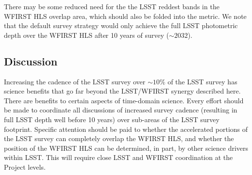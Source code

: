 There may be some reduced need for the the LSST reddest bands in the
WFIRST HLS overlap area, which should also be folded into the metric.
We note that
the default survey strategy would only achieve the full LSST photometric
depth over the WFIRST HLS after 10 years of survey ($\sim2032$).



%
%
%

\subsection{Discussion}
\label{sec:\secname:discussion}

Increasing the cadence of the LSST survey over $\sim10\%$ of the LSST
survey has science benefits that go far beyond the LSST/WFIRST synergy
described here.  There are benefits to certain aspects of time-domain
science.  Every effort should be made to coordinate all discussions of
increased survey cadence (resulting in full LSST depth well before 10
years) over sub-areas of the LSST survey footprint.  Specific attention
should be paid to whether the accelerated portions of the LSST survey
can completely overlap the WFIRST HLS, and whether the position of the
WFIRST HLS can be determined, in part, by other science drivers within
LSST.  This will require close LSST and WFIRST coordination at the
Project levels.



\navigationbar
